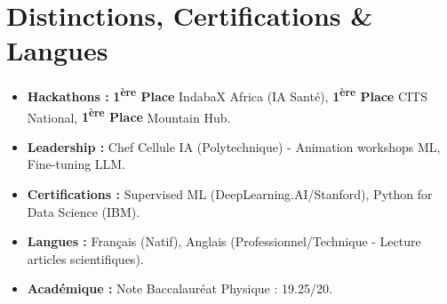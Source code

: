 \documentclass[a4paper,11pt]{article}
\begin{document}
\section{Distinctions, Certifications \& Langues}
\begin{itemize}[leftmargin=*, nosep]
    \item \textbf{Hackathons :} \textbf{1\textsuperscript{ère} Place} IndabaX Africa (IA Santé), \textbf{1\textsuperscript{ère} Place} CITS National, \textbf{1\textsuperscript{ère} Place} Mountain Hub.
    \item \textbf{Leadership :} Chef Cellule IA (Polytechnique) - Animation workshops ML, Fine-tuning LLM.
    \item \textbf{Certifications :} Supervised ML (DeepLearning.AI/Stanford), Python for Data Science (IBM).
    \item \textbf{Langues :} Français (Natif), Anglais (Professionnel/Technique - Lecture articles scientifiques).
    \item \textbf{Académique :} Note Baccalauréat Physique : 19.25/20.
\end{itemize}
\end{document}
